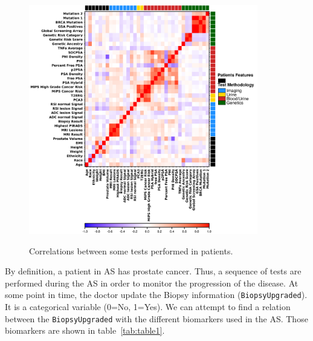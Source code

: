\documentclass[]{article}
\begin{document}
\begin{figure}
\centering
    \includegraphics[width=100mm]{png/correlations.png} \\
\caption{Correlations between some tests performed in patients.}
\label{fig:correlations}
\end{figure}

\noindent By definition, a patient in AS has prostate cancer. Thus, a sequence of tests are performed during the
AS in order to monitor the progression of the disease. At some point in time, the doctor update the Biopsy information
({\verb|BiopsyUpgraded|}). It is a categorical variable (0=No, 1=Yes). We can attempt to find a relation between the 
{\verb|BiopsyUpgraded|} with the different biomarkers used in the AS. Those biomarkers are shown in 
table~\ref{tab:table1}. \\
\end{document}
